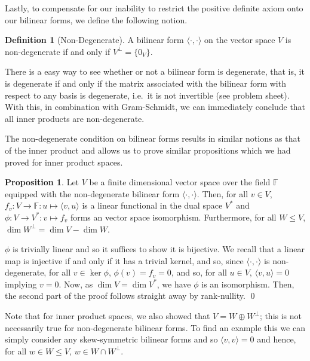 \documentclass[
]{article}
\theoremstyle{definition}
\newtheorem{prop}{Proposition}[section]
\theoremstyle{definition}
\newtheorem{definition}{Definition}[section]
\begin{document}
Lastly, to compensate for our inability to restrict the positive
definite axiom onto our bilinear forms, we define the following notion.

\begin{definition}[Non-Degenerate]
  A bilinear form \(\langle \cdot, \cdot \rangle\) on the vector space \(V\) 
  is non-degenerate if and only if \(V^\bot = \{0_V\}\).
\end{definition}

There is a easy way to see whether or not a bilinear form is degenerate,
that is, it is degenerate if and only if the matrix associated with the
bilinear form with respect to any basis is degenerate, i.e.~it is not
invertible (see problem sheet). With this, in combination with
Gram-Schmidt, we can immediately conclude that all inner products are
non-degenerate.

The non-degenerate condition on bilinear forms results in similar
notions as that of the inner product and allows us to prove similar
propositions which we had proved for inner product spaces.

\begin{prop}
  Let \(V\) be a finite dimensional vector space over the field \(\mathbb{F}\) 
  equipped with the non-degenerate bilinear form \(\langle \cdot, \cdot \rangle\). 
  Then, for all \(v \in V\), \(f_v : V \to \mathbb{F} : u \mapsto \langle v, u \rangle\) 
  is a linear functional in the dual space \(V^*\) and 
  \(\phi : V \to V^* : v \mapsto f_v\) forms an vector space isomorphism.
  Furthermore, for all \(W \le V\), \(\dim W^\bot = \dim V - \dim W\).
\end{prop}
\proof

\(\phi\) is trivially linear and so it suffices to show it is bijective.
We recall that a linear map is injective if and only if it has a trivial
kernel, and so, since \(\langle \cdot, \cdot \rangle\) is
non-degenerate, for all \(v \in \ker \phi\), \(\phi(v) = f_v = 0\), and
so, for all \(u \in V\), \(\langle v, u \rangle = 0\) implying
\(v = 0\). Now, as \(\dim V = \dim V^*\), we have \(\phi\) is an
isomorphism. Then, the second part of the proof follows straight away by
rank-nullity. \qed

Note that for inner product spaces, we also showed that
\(V = W \oplus W^\bot\); this is not necessarily true for non-degenerate
bilinear forms. To find an example this we can simply consider any
skew-symmetric bilinear forms and so \(\langle v, v \rangle = 0\) and
hence, for all \(w \in W \le V\), \(w \in W \cap W^\bot\).
\end{document}
